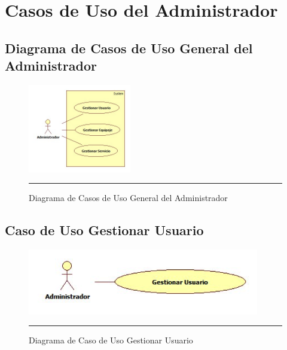\section{Casos de Uso del Administrador}

\subsection{Diagrama de Casos de Uso General del Administrador}

\begin{figure}[htbp]
	\centering
		\includegraphics[width=0.4\textwidth]{Figuras/general.jpg}
		\rule{30em}{0.5pt}
	\caption[Diagrama de Casos de Uso General del Administrador]{Diagrama de Casos de Uso General del Administrador}
	\label{fig:cuGeneralAdministrador}
\end{figure}

\subsection{Caso de Uso Gestionar Usuario}

\begin{figure}[htbp]
	\centering
		\includegraphics[width=0.9\textwidth]{Figuras/cuGestionarUsuario.png}
		\rule{30em}{0.5pt}
	\caption[Diagrama de Caso de Uso Gestionar Usuario]{Diagrama de Caso de Uso Gestionar Usuario}
	\label{fig:cuGestionarUsuario}
\end{figure}
\clearpage

